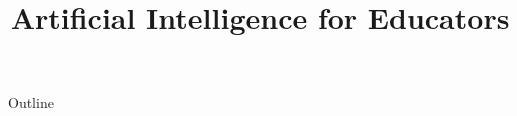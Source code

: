 \documentclass[xcolor=dvipsnames,compress,t,pdf,notes,9pt]{beamer}
\title[\insertframenumber /\inserttotalframenumber]{Artificial Intelligence for Educators}
\begin{document}
	\begin{frame}
	\titlepage
	\end{frame}
	
	\begin{frame}{Outline}
	    \tableofcontents
	\end{frame}

	
	
	
	
	
\end{document}

